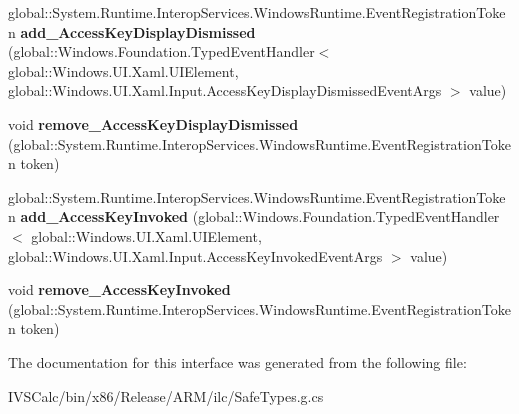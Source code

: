 \begin{DoxyCompactItemize}
global\+::\+System.\+Runtime.\+Interop\+Services.\+Windows\+Runtime.\+Event\+Registration\+Token {\bfseries add\+\_\+\+Access\+Key\+Display\+Dismissed} (global\+::\+Windows.\+Foundation.\+Typed\+Event\+Handler$<$ global\+::\+Windows.\+U\+I.\+Xaml.\+U\+I\+Element, global\+::\+Windows.\+U\+I.\+Xaml.\+Input.\+Access\+Key\+Display\+Dismissed\+Event\+Args $>$ value)
\item 
\mbox{\label{interface_windows_1_1_u_i_1_1_xaml_1_1_i_u_i_element4_a3571804f8a98025c430544d76cfc6f74}} 
void {\bfseries remove\+\_\+\+Access\+Key\+Display\+Dismissed} (global\+::\+System.\+Runtime.\+Interop\+Services.\+Windows\+Runtime.\+Event\+Registration\+Token token)
\item 
\mbox{\label{interface_windows_1_1_u_i_1_1_xaml_1_1_i_u_i_element4_abbf41cd69a2641b693ab19a02690a325}} 
global\+::\+System.\+Runtime.\+Interop\+Services.\+Windows\+Runtime.\+Event\+Registration\+Token {\bfseries add\+\_\+\+Access\+Key\+Invoked} (global\+::\+Windows.\+Foundation.\+Typed\+Event\+Handler$<$ global\+::\+Windows.\+U\+I.\+Xaml.\+U\+I\+Element, global\+::\+Windows.\+U\+I.\+Xaml.\+Input.\+Access\+Key\+Invoked\+Event\+Args $>$ value)
\item 
\mbox{\label{interface_windows_1_1_u_i_1_1_xaml_1_1_i_u_i_element4_ae34bf72d8d0d7a9d33ede980ae1b29db}} 
void {\bfseries remove\+\_\+\+Access\+Key\+Invoked} (global\+::\+System.\+Runtime.\+Interop\+Services.\+Windows\+Runtime.\+Event\+Registration\+Token token)
\end{DoxyCompactItemize}


The documentation for this interface was generated from the following file\+:\begin{DoxyCompactItemize}
\item 
I\+V\+S\+Calc/bin/x86/\+Release/\+A\+R\+M/ilc/Safe\+Types.\+g.\+cs\end{DoxyCompactItemize}
